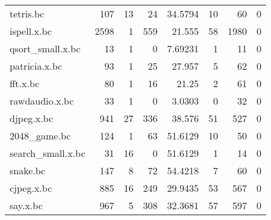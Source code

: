 \begin{table}[ht]
\begin{adjustbox}{width=1.3\textwidth}
\begin{tabular}{lrrrrrrr}
 tetris.bc            &                107 &                    13 &                          24 &               34.5794  &                    10 &                        60 &                             0 \\
 ispell.x.bc          &               2598 &                     1 &                         559 &               21.555   &                    58 &                      1980 &                             0 \\
 qsort\_small.x.bc     &                 13 &                     1 &                           0 &                7.69231 &                     1 &                        11 &                             0 \\
 patricia.x.bc        &                 93 &                     1 &                          25 &               27.957   &                     5 &                        62 &                             0 \\
 fft.x.bc             &                 80 &                     1 &                          16 &               21.25    &                     2 &                        61 &                             0 \\
 rawdaudio.x.bc       &                 33 &                     1 &                           0 &                3.0303  &                     0 &                        32 &                             0 \\
 djpeg.x.bc           &                941 &                    27 &                         336 &               38.576   &                    51 &                       527 &                             0 \\
 2048\_game.bc         &                124 &                     1 &                          63 &               51.6129  &                    10 &                        50 &                             0 \\
 search\_small.x.bc    &                 31 &                    16 &                           0 &               51.6129  &                     1 &                        14 &                             0 \\
 snake.bc             &                147 &                     8 &                          72 &               54.4218  &                     7 &                        60 &                             0 \\
 cjpeg.x.bc           &                885 &                    16 &                         249 &               29.9435  &                    53 &                       567 &                             0 \\
 say.x.bc             &                967 &                     5 &                         308 &               32.3681  &                    57 &                       597 &                             0 \\
\hline
\end{tabular}
\end{adjustbox}
\end{table}

